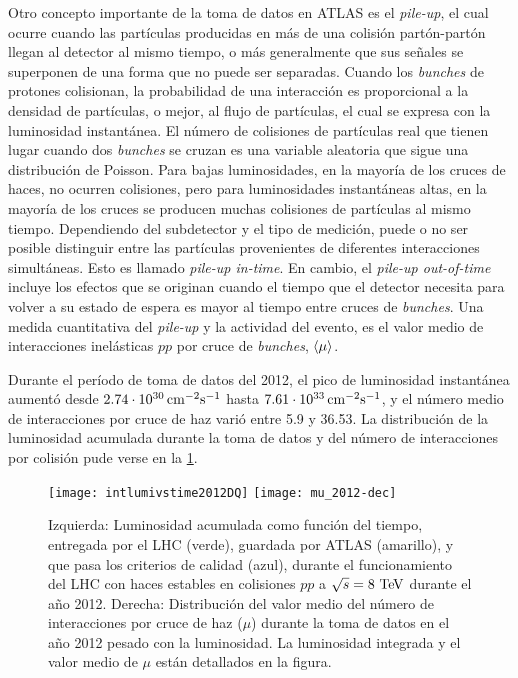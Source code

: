 Otro concepto importante de la toma de datos en ATLAS es el \emph{pile-up}, el
cual ocurre cuando las partículas producidas en más de una colisión
partón-partón llegan al detector al mismo tiempo, o más generalmente que sus
señales se superponen de una forma que no puede ser separadas. Cuando los
\emph{bunches} de protones colisionan, la probabilidad de una interacción es
proporcional a la densidad de partículas, o mejor, al flujo de partículas, el
cual se expresa con la luminosidad instantánea. El número de colisiones de
partículas real que tienen lugar cuando dos \emph{bunches} se cruzan es una
variable aleatoria que sigue una distribución de Poisson. Para bajas
luminosidades, en la mayoría de los cruces de haces, no ocurren colisiones, pero para
luminosidades instantáneas altas, en la mayoría de los cruces se producen muchas
colisiones de partículas al mismo tiempo. Dependiendo del subdetector y el tipo
de medición, puede o no ser posible distinguir entre las partículas provenientes
de diferentes interacciones simultáneas. Esto es llamado \emph{pile-up in-time}.
En cambio, el \emph{pile-up out-of-time} incluye los efectos que se originan
cuando el tiempo que el detector necesita para volver a su estado de espera es
mayor al tiempo entre cruces de \emph{bunches}. Una medida cuantitativa del
\emph{pile-up} y la actividad del evento, es el valor medio de interacciones
inelásticas $pp$ por cruce de \emph{bunches}, $\langle \mu \rangle$.

Durante el período de toma de datos del 2012, el pico de luminosidad instantánea
aumentó desde $\unit[2.74 \cdot 10^{30}]{cm^{-2} s^{-1}}$ hasta
$\unit[7.61 \cdot 10^{33}]{cm^{-2} s^{-1}}$, y el número medio de interacciones por cruce
de haz varió entre 5.9 y 36.53. La distribución de la luminosidad acumulada
durante la toma de datos y del número de interacciones por colisión pude verse en
la \cref{fig:lumi}.

\begin{figure}[!p]
  \centering

  \texttt{[image: intlumivstime2012DQ]}
  \texttt{[image: mu\_2012-dec]}

  \caption{Izquierda: Luminosidad acumulada como función del tiempo, entregada por el LHC (verde),
    guardada por ATLAS (amarillo), y que pasa los criterios de calidad (azul),
    durante el funcionamiento del LHC con haces estables en colisiones $pp$ a $\sqrt{s}=8\tev$ durante el a\~no 2012\cite{lumiplots}.
    Derecha: Distribución del valor medio del número de interacciones por cruce
    de haz ($\mu$) durante la toma de datos en el a\~no 2012 pesado con la luminosidad.
    La luminosidad integrada y el valor medio de $\mu$ están detallados en la figura.
  }
  \label{fig:lumi}

\end{figure}
